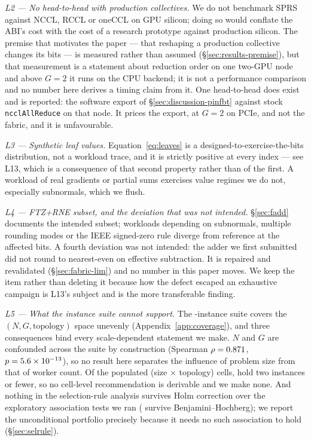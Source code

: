 \documentclass[journal,10pt]{IEEEtran}
\theoremstyle{plain}
\theoremstyle{definition}
\theoremstyle{remark}
\newcommand{\sprs}{\textsc{SPRS}}
\begin{document}
\emph{L2 --- No head-to-head with production collectives.} We do not
benchmark \sprs{} against NCCL, RCCL or oneCCL on GPU silicon; doing so would
conflate the ABI's cost with the cost of a research prototype against
production silicon. The premise that motivates the paper --- that reshaping a
production collective changes its bits --- is measured rather than assumed
(\S\ref{sec:results-premise}), but that measurement is a statement about
reduction order on one two-GPU node and above $G{=}2$ it runs on the CPU
backend; it is not a performance comparison and no number here derives a
timing claim from it. One head-to-head does exist and is reported: the
software export of \S\ref{sec:discussion-pinfbt} against stock
\texttt{ncclAllReduce} on that node. It prices the export, at $G{=}2$ on
PCIe, and not the fabric, and it is unfavourable.

\emph{L3 --- Synthetic leaf values.} Equation~\eqref{eq:leaves} is a
designed-to-exercise-the-bits distribution, not a workload trace, and it is
strictly positive at every index --- see L13, which is a consequence of that
second property rather than of the first. A workload of real gradients or
partial sums exercises value regimes we do not, especially subnormals, which
we flush.

\emph{L4 --- FTZ+RNE subset, and the deviation that was not intended.}
\S\ref{sec:fadd} documents the intended subset; workloads depending on
subnormals, multiple rounding modes or the IEEE signed-zero rule diverge from
reference at the affected bits. A fourth deviation was not intended: the adder
we first submitted did not round to nearest-even on effective subtraction. It
is repaired and revalidated (\S\ref{sec:fabric-lim}) and no number in this
paper moves. We keep the item rather than deleting it because how the defect
escaped an exhaustive campaign is L13's subject and is the more transferable
finding.

\emph{L5 --- What the instance suite cannot support.} The \SuiteSize{}-instance
suite covers the $(N, G, \text{topology})$ space unevenly
(Appendix~\ref{app:coverage}), and three consequences bind every
scale-dependent statement we make. $N$ and $G$ are confounded across the suite
by construction (Spearman $\rho = 0.871$, $p = 5.6\times10^{-13}$), so no result
here separates the influence of problem size from that of worker count. Of the
\SelPopCells{} populated (size $\times$ topology) cells, \SelThinCells{} hold
two instances or fewer, so no cell-level recommendation is derivable and we
make none. And nothing in the selection-rule analysis survives Holm correction
over the \SelExpTests{} exploratory association tests we ran
(\SelBHSurvivors{} survive Benjamini--Hochberg); we report the unconditional
portfolio precisely because it needs no such association to hold
(\S\ref{sec:selrule}).
\end{document}
